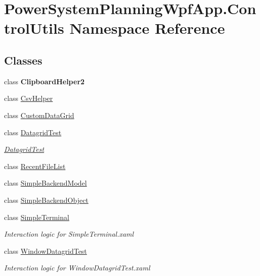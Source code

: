 \hypertarget{namespace_power_system_planning_wpf_app_1_1_control_utils}{}\section{Power\+System\+Planning\+Wpf\+App.\+Control\+Utils Namespace Reference}
\label{namespace_power_system_planning_wpf_app_1_1_control_utils}
\subsection*{Classes}
\begin{DoxyCompactItemize}
\item 
class {\bfseries Clipboard\+Helper2}
\item 
class \hyperlink{class_power_system_planning_wpf_app_1_1_control_utils_1_1_csv_helper}{Csv\+Helper}
\item 
class \hyperlink{class_power_system_planning_wpf_app_1_1_control_utils_1_1_custom_data_grid}{Custom\+Data\+Grid}
\item 
class \hyperlink{class_power_system_planning_wpf_app_1_1_control_utils_1_1_datagrid_test}{Datagrid\+Test}
\begin{DoxyCompactList}\small\item\em \hyperlink{class_power_system_planning_wpf_app_1_1_control_utils_1_1_datagrid_test}{Datagrid\+Test} \end{DoxyCompactList}\item 
class \hyperlink{class_power_system_planning_wpf_app_1_1_control_utils_1_1_recent_file_list}{Recent\+File\+List}
\item 
class \hyperlink{class_power_system_planning_wpf_app_1_1_control_utils_1_1_simple_backend_model}{Simple\+Backend\+Model}
\item 
class \hyperlink{class_power_system_planning_wpf_app_1_1_control_utils_1_1_simple_backend_object}{Simple\+Backend\+Object}
\item 
class \hyperlink{class_power_system_planning_wpf_app_1_1_control_utils_1_1_simple_terminal}{Simple\+Terminal}
\begin{DoxyCompactList}\small\item\em Interaction logic for Simple\+Terminal.\+xaml \end{DoxyCompactList}\item 
class \hyperlink{class_power_system_planning_wpf_app_1_1_control_utils_1_1_window_datagrid_test}{Window\+Datagrid\+Test}
\begin{DoxyCompactList}\small\item\em Interaction logic for Window\+Datagrid\+Test.\+xaml \end{DoxyCompactList}\end{DoxyCompactItemize}
